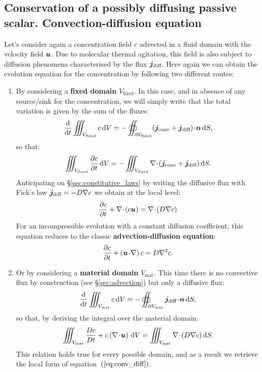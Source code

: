\subsection{Conservation of a possibly diffusing passive scalar. Convection-diffusion equation}
Let's consider again a concentration field $c$ advected in a fluid domain with the velocity field $\bu$. Due to molecular thermal agitation, this field is also subject to diffusion phenomena characterised by the flux $\bj_\text{diff}$. Here again we can obtain the evolution equation for the concentration by following two different routes:
\begin{enumerate}
\item By considering a \textbf{fixed domain} $V_\text{fixed}$. In this case, and in absence of any source/sink for the concentration, we will simply write that the total variation is given by the sum of the fluxes:
$$
\dd{}{t} \iiint_{V_\text{fixed}} c \, \dV = - \oiint_{\partial V_\text{fixed}} (\bj_\text{conv} + \bj_\text{diff}) \!\cdot\!\bn\,\dS,
$$
so that: 
$$
\iiint_{V_\text{fixed}} \pd{c}{t} \, \dV = - \iiint_{V_\text{fixed}} \nabla \!\cdot\! (\bj_\text{conv} + \bj_\text{diff})\,\dS.
$$
Anticipating on \S \ref{sec:constitutive_laws} by writing the diffusive flux with Fick's law $\bj_\text{diff} = - D \nabla c$ we obtain at the local level:
\begin{equation}
\pd{c}{t} + \nabla \!\cdot\! \lp c\bu\rp = \nabla \!\cdot\! (D \nabla c) 
\label{eq:conv_diff}
\end{equation}
For an incompressible evolution with a constant diffusion coefficient, this equation reduces to the classic \textbf{advection-diffusion equation}:
\begin{equation}
\pd{c}{t} + \lp\bu\!\cdot\!\nabla\rp c = D \nabla^2 c.
\label{eq:conv_diff_incompressible}
\end{equation}
\item Or by considering a \textbf{material domain} $V_\text{mat}$. This time there is no convective flux by construction (see \S\ref{sec:advection}) but only a diffusive flux: 
$$
\dd{}{t} \iiint_{V_\text{mat}} c \, \dV = - \oiint_{\partial V_\text{mat}} \bj_\text{diff} \!\cdot\!\bn\,\dS,
$$
so that, by deriving the integral over the material domain:
$$
\iiint_{V_\text{mat}} \D{c}{t} + c \lp\nabla\!\cdot\!\bu\rp \, \dV = \iiint_{V_\text{mat}} \nabla \!\cdot\! (D \nabla c)\,\dS.
$$
This relation holds true for every possible domain, and as a result we retrieve the local form of equation~$\left(\ref{eq:conv_diff}\right)$.
\end{enumerate}
